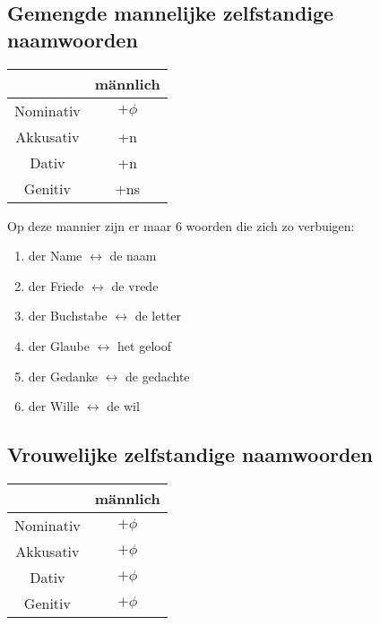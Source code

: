 \documentclass[main.tex]{subfiles}
\begin{document}
\subsection{Gemengde mannelijke zelfstandige naamwoorden}
\begin{minipage}[t]{0,33\textwidth}
\begin{tabular}{|c|c|}
\hline 
\rowcolor{gray}
 & männlich \\ 
\hline 
\cellcolor[gray]{0.8}Nominativ & $+\phi$ \\ 
\hline 
\cellcolor[gray]{0.8}Akkusativ & +n \\ 
\hline 
\cellcolor[gray]{0.8}Dativ & +n\\ 
\hline 
\cellcolor[gray]{0.8}Genitiv & +ns \\ 
\hline 
\end{tabular} 
\end{minipage}
\begin{minipage}{0,67\textwidth}
Op deze mannier zijn er maar 6 woorden die zich zo verbuigen:
\begin{enumerate}
\item der Name $\leftrightarrow$ de naam
\item der Friede $\leftrightarrow$ de vrede
\item der Buchstabe $\leftrightarrow$ de letter
\item der Glaube $\leftrightarrow$ het geloof
\item der Gedanke $\leftrightarrow$ de gedachte
\item der Wille $\leftrightarrow$ de wil
\end{enumerate}
\end{minipage}

\subsection{Vrouwelijke zelfstandige naamwoorden}
\begin{tabular}{|c|c|}
\hline 
\rowcolor{gray}
 & männlich \\ 
\hline 
\cellcolor[gray]{0.8}Nominativ & $+\phi$ \\ 
\hline 
\cellcolor[gray]{0.8}Akkusativ & $+\phi$ \\ 
\hline 
\cellcolor[gray]{0.8}Dativ & $+\phi$ \\ 
\hline 
\cellcolor[gray]{0.8}Genitiv & $+\phi$ \\ 
\hline 
\end{tabular}
\end{document}
